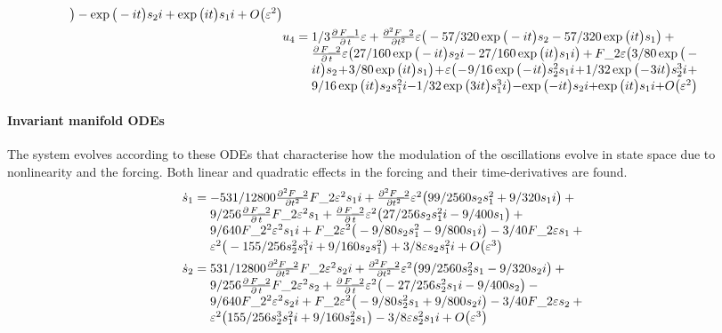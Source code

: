 \begin{align*}
{\big)-\exp \big(-i t\big) s_{2} i+\exp \big(i t\big) s_{1} i+O\big(
\varepsilon ^{2}\big)
}\\&
u_{4}=\ParMath{
1/3 \frac{\partial \,F\_1}{\partial \,t} \eps{}+\frac{\partial 
^{2}F\_2}{\partial t^{2}} \eps{} \big(-57/320 \exp \big(-i t\big) s_{2
}-57/320 \exp \big(i t\big) s_{1}\big)+\frac{\partial \,F\_2}{\partial 
\,t} \eps{} \big(27/160 \exp \big(-i t\big) s_{2} i-27/160 \exp \big(i
 t\big) s_{1} i\big)+F\_2 \eps{} \big(3/80 \exp \big(-i t\big) s_{2}+3
/80 \exp \big(i t\big) s_{1}\big)+\eps{} \big(-9/16 \exp \big(-i t
\big) s_{2}^{2} s_{1} i+1/32 \exp \big(-3 i t\big) s_{2}^{3} i+9/16 \exp
 \big(i t\big) s_{2} s_{1}^{2} i-1/32 \exp \big(3 i t\big) s_{1}^{3} i
\big)-\exp \big(-i t\big) s_{2} i+\exp \big(i t\big) s_{1} i+O\big(
\varepsilon ^{2}\big)
}
\end{align*}

 
\paragraph{Invariant manifold ODEs} 
The system evolves according to these ODEs that characterise
how the modulation of the oscillations evolve in state space
due to nonlinearity and the forcing.   Both linear and
quadratic effects in the forcing and their time-derivatives
are found.
\begin{align*}&
\dot s_{1}=\ParMath{
-531/12800 \frac{\partial ^{2}F\_2}{\partial t^{2}} F\_2 \eps
^{2} s_{1} i+\frac{\partial ^{2}F\_2}{\partial t^{2}} \eps^2 \big(99/
2560 s_{2} s_{1}^{2}+9/320 s_{1} i\big)+9/256 \frac{\partial \,F\_2}{
\partial \,t} F\_2 \eps^2 s_{1}+\frac{\partial \,F\_2}{\partial \,t} 
\eps^2 \big(27/256 s_{2} s_{1}^{2} i-9/400 s_{1}\big)+9/640 F\_2^{2} 
\eps^2 s_{1} i+F\_2 \eps^2 \big(-9/80 s_{2} s_{1}^{2}-9/800 s_{1} i
\big)-3/40 F\_2 \eps{} s_{1}+\eps^2 \big(-155/256 s_{2}^{2} s_{1}^{3
} i+9/160 s_{2} s_{1}^{2}\big)+3/8 \eps{} s_{2} s_{1}^{2} i+O\big(
\varepsilon ^{3}\big)
}\\&
\dot s_{2}=\ParMath{
531/12800 \frac{\partial ^{2}F\_2}{\partial t^{2}} F\_2 \eps
^{2} s_{2} i+\frac{\partial ^{2}F\_2}{\partial t^{2}} \eps^2 \big(99/
2560 s_{2}^{2} s_{1}-9/320 s_{2} i\big)+9/256 \frac{\partial \,F\_2}{
\partial \,t} F\_2 \eps^2 s_{2}+\frac{\partial \,F\_2}{\partial \,t} 
\eps^2 \big(-27/256 s_{2}^{2} s_{1} i-9/400 s_{2}\big)-9/640 F\_2^{2} 
\eps^2 s_{2} i+F\_2 \eps^2 \big(-9/80 s_{2}^{2} s_{1}+9/800 s_{2} i
\big)-3/40 F\_2 \eps{} s_{2}+\eps^2 \big(155/256 s_{2}^{3} s_{1}^{2}
 i+9/160 s_{2}^{2} s_{1}\big)-3/8 \eps{} s_{2}^{2} s_{1} i+O\big(
\varepsilon ^{3}\big)
}
\end{align*}


